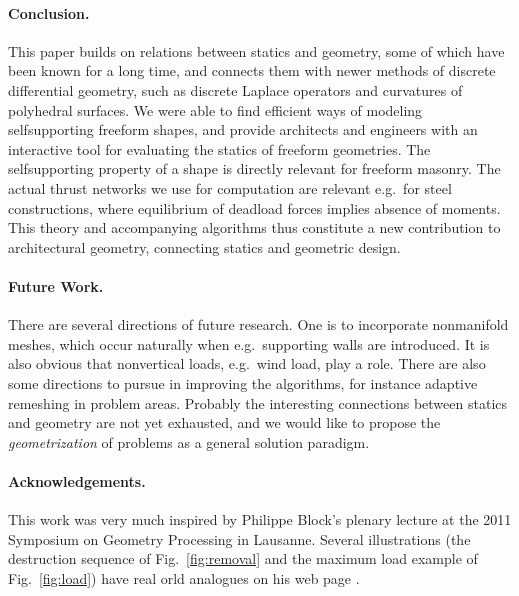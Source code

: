 \documentclass[review]{acmsiggraph}
\begin{document}
\paragraph{Conclusion.}

This paper builds on relations between statics and geometry, some of which
have been known for a long time, and connects them with newer methods of
discrete differential geometry, such as discrete Laplace operators and
curvatures of polyhedral surfaces. We were able to find efficient ways of
modeling self\dash supporting freeform shapes, and provide architects and
engineers with an interactive tool for evaluating the
statics of freeform geometries. The self\dash supporting property of a
shape is directly relevant for freeform masonry. The actual thrust
networks we use for computation are relevant e.g.\ for steel
constructions, where equilibrium of deadload forces implies absence of
moments. This theory and accompanying algorithms thus constitute a new
contribution to architectural geometry, connecting statics and geometric
design.

\paragraph{Future Work.}

There are several directions of future research. One is to incorporate
non\dash manifold meshes, which occur naturally when e.g.\ supporting
walls are introduced. It is also obvious that non\dash vertical loads,
e.g.\ wind load, play a role. There are also some directions to pursue in
improving the algorithms, for instance adaptive remeshing in problem
areas. Probably the interesting connections between statics and
geometry are not yet exhausted, and we would like to propose the {\em
geometrization} of problems as a general solution paradigm.

\paragraph*{Acknowledgements.}

This work was very much inspired by Philippe Block's plenary lecture
at the 2011 Symposium on Geometry Processing in Lausanne. Several
illustrations (the destruction sequence of Fig.~\ref{fig:removal}
and the maximum load example of Fig.~\ref{fig:load}) have real\dash 
orld analogues on his web page \cite{catalan}.
\end{document}
